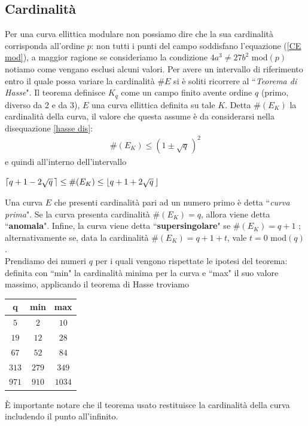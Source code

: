 \documentclass[a4paper,12pt]{tesiinfo}
\DeclarePairedDelimiter\ceil{\lceil}{\rceil}
\DeclarePairedDelimiter\floor{\lfloor}{\rfloor}
\begin{document}
\subsection{Cardinalit\`a}
\label{cardin}
Per una curva ellittica modulare non possiamo dire che la sua cardinalit\`a corrisponda all'ordine $p$: non tutti i punti del campo soddisfano l'equazione (\ref{CE mod}), a maggior ragione se consideriamo la condizione $4a^3 \ne 27b^2$ mod$(p)$ notiamo come vengano esclusi alcuni valori. Per avere un intervallo di riferimento entro il quale possa variare la cardinalit\`a $\#E$ si \`e soliti ricorrere al ``\textit{Teorema di Hasse}". Il teorema definisce $K_q$ come un campo finito avente ordine $q$ (primo, diverso da 2 e da 3), $E$ una curva ellittica definita su tale $K$. Detta $\#(E_K)$ la cardinalit\`a della curva, il valore che questa assume \`e da considerarsi nella disequazione \ref{hasse dis}:
\begin{gather}
 \#(E_K) \le (1 \pm \sqrt {q} \,)^2
 \label{hasse dis}
\end{gather}
e quindi all'interno dell'intervallo
\begin{center}
 $\ceil{q+1-2 \sqrt {q} \,} \le \#(E_K) \le \floor{q+1+2 \sqrt {q} \,}$
\end{center}
Una curva $E$ che presenti cardinalit\`a pari ad un numero primo \`e detta ``\textit{curva prima}". Se la curva presenta cardinalit\`a $\#(E_K)=q$, allora viene detta ``\textbf{anomala}". Infine, la curva viene detta ``\textbf{supersingolare}" se $\#(E_K) = q+1$ \cite{supersingolare}; alternativamente se, data la cardinalit\`a $\#(E_K) = q+1+t$, vale $t=0$ mod$(q)$ \cite{rho for poliwag}.
\\
Prendiamo dei numeri $q$ per i quali vengono rispettate le ipotesi del teorema: definita con ``min" la cardinalit\`a minima per la curva e ``max" il suo valore massimo, applicando il teorema di Hasse troviamo
\begin{center}
\begin{tabular}{ c | c c }
 q & min & max\\
 \hline
 $5$ &$2$ &$10$\\
 $19$ &$12$ &$28$\\
 $67$ &$52$ &$84$\\
 $313$ &$279$ &$349$\\
 $971$ &$910$ &$1034$\\
\end{tabular}
\end{center}
\`E importante notare che il teorema usato restituisce la cardinalit\`a della curva includendo il punto all'infinito.
\end{document}
